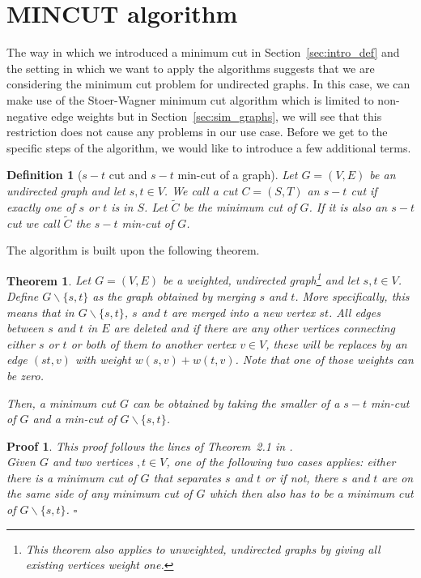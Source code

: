 \documentclass[paper=a4,fontsize=11pt,DIV=8,BCOR=5mm,twoside,pdftex,bibtotocnumbered]{scrreprt}
\theoremstyle{plain}
\newtheorem{thm}{Theorem}
\newtheorem{definition}[proposition]{Definition}
\newtheorem*{myproof}{Proof}
\newenvironment{pf}{\begin{myproof}}{\hfill$\square$\end{myproof}}
\begin{document}
\section{MINCUT algorithm}\label{sec:mincut}
The way in which we introduced a minimum cut in Section~\ref{sec:intro_def} and the setting in which we want to apply the algorithms suggests that we are considering the minimum cut problem for undirected graphs. In this case, we can make use of the Stoer-Wagner minimum cut algorithm which is limited to non-negative edge weights but in Section~\ref{sec:sim_graphs}, we will see that this restriction does not cause any problems in our use case. Before we get to the specific steps of the algorithm, we would like to introduce a few additional terms.

\begin{definition}[$s-t$ cut and $s-t$ min-cut of a graph]
	Let $G=(V,E)$ be an undirected graph and let $s,t \in V$. We call a cut $C=(S,T)$ an \emph{$s-t$ cut} if exactly one of $s$ or $t$ is in $S$. Let $\tilde{C}$ be the minimum cut of $G$. If it is also an $s-t$ cut we call $\tilde{C}$ the \emph{$s-t$ min-cut} of $G$.
\end{definition}

The algorithm is built upon the following theorem.

\begin{thm}
	Let $G=(V,E)$ be a weighted, undirected graph\footnote{This theorem also applies to unweighted, undirected graphs by giving all existing vertices weight one.} and let $s,t \in V$. Define $G\backslash\{s,t\}$ as the graph obtained by merging $s$ and $t$. More specifically, this means that in $G\backslash\{s,t\}$, $s$ and $t$ are merged into a new vertex $st$. All edges between $s$ and $t$ in $E$ are deleted and if there are any other vertices connecting either $s$ or $t$ or both of them to another vertex $v\in V$, these will be replaces by an edge $(st, v)$ with weight $w(s,v) +  w(t,v)$. Note that one of those weights can be zero.
	
	Then, a minimum cut $G$ can be obtained by taking the smaller of a $s-t$ min-cut of $G$ and a min-cut of $G\backslash\{s,t\}$.
\end{thm}

\begin{pf}
	This proof follows the lines of Theorem~2.1 in \cite{Stoer1997}.\\
	Given $G$ and two vertices $,t\in V$, one of the following two cases applies: either there is a minimum cut of $G$ that separates $s$ and $t$ or if not, there $s$ and $t$ are on the same side of any minimum cut of $G$ which then also has to be a minimum cut of $G\backslash\{s,t\}$.
\end{pf}
\end{document}
